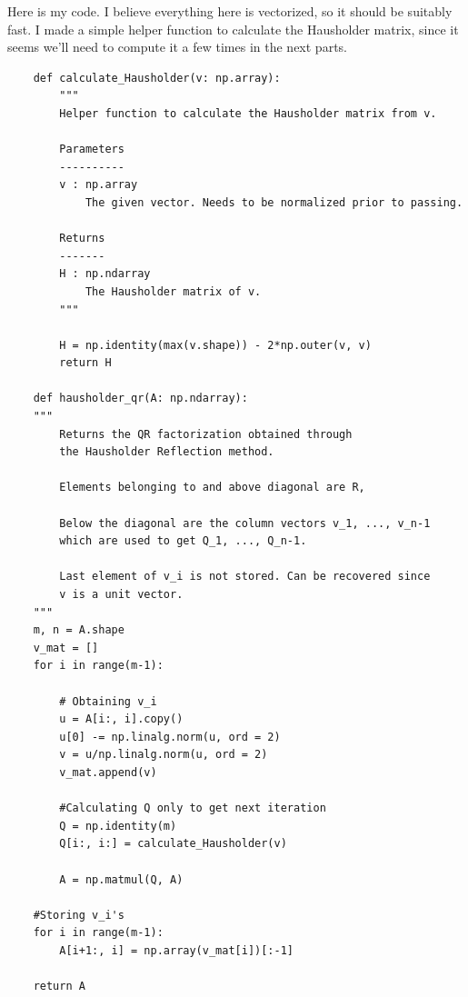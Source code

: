 \begin{solution}

    Here is my code. I believe everything here is vectorized, so it should be suitably fast. I made a simple helper function to calculate the Hausholder matrix, since it seems we'll need to compute it a few times in the next parts.

\begin{lstlisting}
    def calculate_Hausholder(v: np.array):
        """
        Helper function to calculate the Hausholder matrix from v.
        
        Parameters
        ----------
        v : np.array
            The given vector. Needs to be normalized prior to passing.
            
        Returns
        -------
        H : np.ndarray
            The Hausholder matrix of v.
        """
        
        H = np.identity(max(v.shape)) - 2*np.outer(v, v)
        return H

    def hausholder_qr(A: np.ndarray):
    """
        Returns the QR factorization obtained through 
        the Hausholder Reflection method. 
        
        Elements belonging to and above diagonal are R, 
        
        Below the diagonal are the column vectors v_1, ..., v_n-1
        which are used to get Q_1, ..., Q_n-1. 
        
        Last element of v_i is not stored. Can be recovered since 
        v is a unit vector.
    """
    m, n = A.shape
    v_mat = []
    for i in range(m-1):
        
        # Obtaining v_i
        u = A[i:, i].copy()
        u[0] -= np.linalg.norm(u, ord = 2)
        v = u/np.linalg.norm(u, ord = 2)
        v_mat.append(v)
        
        #Calculating Q only to get next iteration
        Q = np.identity(m)
        Q[i:, i:] = calculate_Hausholder(v)
        
        A = np.matmul(Q, A)

    #Storing v_i's
    for i in range(m-1):
        A[i+1:, i] = np.array(v_mat[i])[:-1]
        
    return A
\end{lstlisting}
\end{solution}

\newpage
